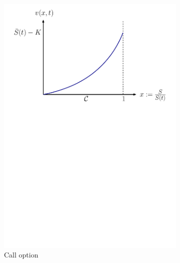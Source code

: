 \begin{figure}[H]
  \centering
  \begin{subfigure}{0.45\textwidth}
    \centering
    \includegraphics[width=\textwidth]{chapters/chapter2/NielsenCallOption}
    \caption{Call option}
    \label{fig:blackscholes:frontfixingmethod:nielsen_call_value_vs_curve}
  \end{subfigure}
  \begin{subfigure}{0.45\textwidth}
    \centering

\end{subfigure}
\end{figure}
